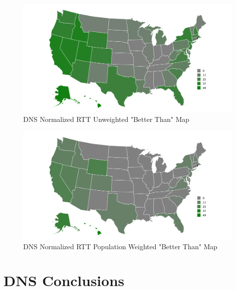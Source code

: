 \begin{figure}
    \centering
    \includegraphics{images/dns/analysis_auth_agg/rtt_normalized/unweighted/num_better_than_map_norm_rtt_un.png}
    \caption{DNS Normalized RTT Unweighted "Better Than" Map}
    \label{fig:dns_auth_agg_num_better_map_norm_rtt_un}
\end{figure}

\begin{figure}
    \centering
    \includegraphics{images/dns/analysis_auth_agg/rtt_normalized/population/num_better_than_map_norm_rtt_pop.png}
    \caption{DNS Normalized RTT Population Weighted "Better Than" Map}
    \label{fig:dns_auth_agg_num_better_map_norm_rtt_pop}
\end{figure}




\section{DNS Conclusions}